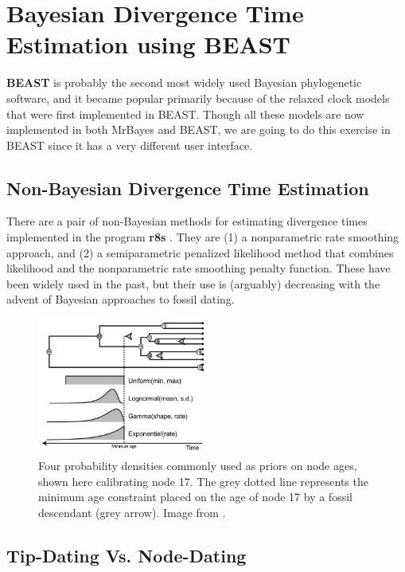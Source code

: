 \documentclass[11pt]{article}
\begin{document}
\section{Bayesian Divergence Time Estimation using BEAST}

\textbf{BEAST} \citep{bouckaert2014beast} is probably the second most widely used Bayesian phylogenetic software,
and it became popular primarily because of the relaxed clock models
that were first implemented in BEAST.
Though all these models are now implemented in both MrBayes and BEAST,
we are going to do this exercise in BEAST since it has a very different user interface.

\subsection{Non-Bayesian Divergence Time Estimation}

There are a pair of non-Bayesian methods for estimating divergence times
implemented in the program \textbf{r8s} \citep{sanderson2003r8s}.
They are (1) a nonparametric rate smoothing approach, and (2) a
semiparametric penalized likelihood method that combines 
likelihood and the nonparametric rate smoothing penalty function.
These have been widely used in the past, but their use is (arguably) decreasing
with the advent of Bayesian approaches to fossil dating.

\begin{figure}
\centering
\includegraphics[width=0.5\textwidth]{node_calibration.png}
\caption{Four probability densities commonly used as priors on node ages,
shown here calibrating node 17. The grey dotted line
represents the minimum age constraint placed on the age of node 17 
by a fossil descendant (grey arrow).
Image from \protect\citet{heath2012hierarchical}.}
\end{figure}

\subsection{Tip-Dating Vs. Node-Dating}
\end{document}
